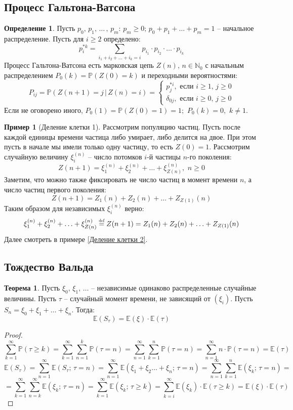 \documentclass[12pt]{article}
\theoremstyle{definition}
\newtheorem{theorem}{Теорема}[section]
\newtheorem*{example}{Пример}
\newtheorem{definition}{Определение}
\newcommand{\N}{\mathbb{N}}
\newcommand{\E}{\mathbb{E}}
\newcommand{\prob}{\mathbb{P}}
\newcommand\defeq{\stackrel{\mathclap{\scalebox{0.6}{def}}}{=}}
\begin{document}
\subsection{Процесс Гальтона-Ватсона}

\begin{definition}
    Пусть $p_0,\,p_1,\,\ldots\,,\,p_m:\,p_m\geq 0;\,p_0+p_1+\ldots+p_m=1$ – начальное распределение. Пусть для $i\geq 2$ определено: $$p_i^{*k}=\sum_{i_1+i_2+\ldots+i_k=i}p_{i_1}\cdot p_{i_2}\cdot\ldots\cdot p_{i_k}$$
    Процесс Гальтона-Ватсона есть марковская цепь $Z(n),\, n\in \N_0$ с начальным распределением $P_0(k)=\prob(Z(0)=k)$ и переходными вероятностями:
    $$P_{ij}=\prob(Z(n+1)=j\,|\,Z(n)=i)=\begin{cases}
        p_j^{*i},\text{ если }i\geq 1,\,j\geq 0\\
        \delta_{0j},\text{ если }i\geq 0,\,j\geq 0
    \end{cases}$$
    Если не оговорено иного, $P_0(1)=\prob(Z(0)=1)=1;\,\,P_0(k)=0,\,\,k\neq1$.
\end{definition}
\begin{example}[Деление клетки 1]\label{Деление клетки 1}
    Рассмотрим популяцию частиц. Пусть после каждой единицы времени частица либо умирает, либо делится на двое. При этом пусть в начале мы имели только одну частицу, то есть $Z(0)=1$. Рассмотрим случайную величину $\xi_i^{(n)}$ – число потомков $i$-й частицы $n$-го поколения:
    $$Z(n+1)=\xi_1^{(n)}+\xi_2^{(n)}+\ldots+\xi_{Z(n)}^{(n)},\,\,n\geq0$$
    Заметим, что можно также фиксировать не число частиц в момент времени $n$, а число частиц первого поколения:
    $$Z(n+1)=Z_1(n)+Z_2(n)+\ldots+Z_{Z(1)}(n)$$
    Таким образом для независимых $\xi_i^{(n)}$ верно:
    $$\xi_1^{(n)}+\xi_2^{(n)}+\ldots+\xi_{Z(n)}^{(n)}\defeq Z(n+1)=Z_1(n)+Z_2(n)+\ldots+Z_{Z(1)}(n)$$
    Далее смотреть в примере \ref{Деление клетки 2}.
\end{example}

\subsection{Тождество Вальда}

\begin{theorem}
    Пусть $\xi_0,\,\xi_1,\,\ldots$ – независимые одинаково распределенные случайные величины. Пусть $\tau$ – случайный момент времени, не зависящий от $(\xi_i)$. Пусть $S_n=\xi_0+\xi_1+\ldots+\xi_n$. Тогда:
    $$\E(S_\tau)=\E(\xi)\cdot\E(\tau)$$ 
\end{theorem}
\begin{proof}
    $$\sum_{k=1}^{\infty}\prob(\tau\geq k)=\sum_{k=1}^{\infty}\sum_{n=1}^{k}\prob(\tau=n)=\sum_{n=1}^{\infty}\sum_{k=1}^{n}\prob(\tau=n)=\sum_{n=1}^{\infty}n\cdot\prob(\tau=n)=\E(\tau)$$
    $$\E(S_\tau)=\sum_{n=1}^{\infty}\E(S_\tau;\,\tau=n)=\sum_{n=1}^{\infty}\E(\xi_1+\xi_2\ldots+\xi_n;\,\tau=n)=\sum_{n=1}^{\infty}\sum_{k=1}^{n}\E(\xi_k;\,\tau=n)=$$
    $$=\sum_{k=1}^{\infty}\sum_{n=k}^{\infty}\E(\xi_k;\,\tau=n)=\sum_{k=1}^{\infty}\E(\xi_k;\,\tau\geq k)=\sum_{k=i}^{\infty}\E(\xi_k)\cdot\E(\tau\geq k)=\E(\xi)\cdot\E(\tau)$$
\end{proof}
\end{document}
